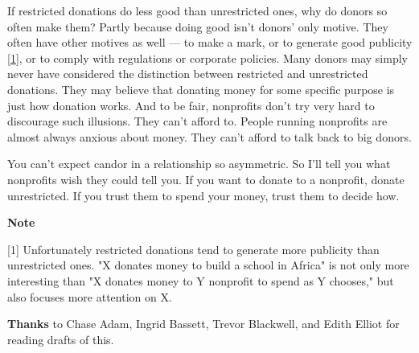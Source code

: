 If restricted donations do
                  less good than unrestricted ones, why do donors so often make
                  them? Partly because doing good isn't donors' only motive.
                  They often have other motives as well --- to make a mark,
                  or to generate good publicity
                  [\href{\#f1n}{1}], or to comply with regulations or corporate policies. Many
                  donors may simply never have considered the distinction
                  between restricted and unrestricted donations. They may
                  believe that donating money for some specific purpose is just
                  how donation works. And to be fair, nonprofits don't try very
                  hard to discourage such illusions. They can't afford to.
                  People running nonprofits are almost always anxious about
                  money. They can't afford to talk back to big donors.

You
                  can't expect candor in a relationship so asymmetric. So I'll
                  tell you what nonprofits wish they could tell you. If you want
                  to donate to a nonprofit, donate unrestricted. If you trust
                  them to spend your money, trust them to decide how.






                  \textbf{Note}

[1] Unfortunately restricted donations tend to generate more
                  publicity than unrestricted ones. "X donates money to build a
                  school in Africa" is not only more interesting than "X donates
                  money to Y nonprofit to spend as Y chooses," but also focuses
                  more attention on X.


                  \textbf{Thanks} to Chase Adam, Ingrid Bassett, Trevor Blackwell,
                  and Edith Elliot for reading drafts of this.


              
            
          
            
              
                


                  
              
            
          
